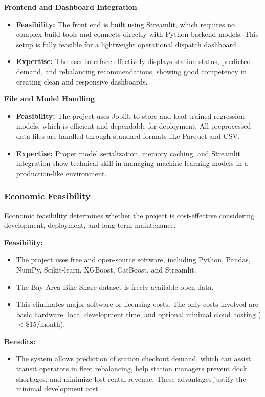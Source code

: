 \documentclass[12pt, a4paper]{article}
\renewcommand{\_}{\textunderscore\allowbreak}
\begin{document}
\noindent \textbf{Frontend and Dashboard Integration}
\begin{itemize}
    \item \textbf{Feasibility:} The front end is built using Streamlit, which requires no complex build tools and connects directly with Python backend models. This setup is fully feasible for a lightweight operational dispatch dashboard.
    \item \textbf{Expertise:} The user interface effectively displays station status, predicted demand, and rebalancing recommendations, showing good competency in creating clean and responsive dashboards.
\end{itemize}

\noindent \textbf{File and Model Handling}
\begin{itemize}
    \item \textbf{Feasibility:} The project uses Joblib to store and load trained regression models, which is efficient and dependable for deployment. All preprocessed data files are handled through standard formats like Parquet and CSV.
    \item \textbf{Expertise:} Proper model serialization, memory caching, and Streamlit integration show technical skill in managing machine learning models in a production-like environment.
\end{itemize}

\subsubsection{Economic Feasibility}

Economic feasibility determines whether the project is cost-effective considering development, deployment, and long-term maintenance.

\noindent \textbf{Feasibility:}
\begin{itemize}
    \item The project uses free and open-source software, including Python, Pandas, NumPy, Scikit-learn, XGBoost, CatBoost, and Streamlit.
    \item The Bay Area Bike Share dataset is freely available open data.
    \item This eliminates major software or licensing costs. The only costs involved are basic hardware, local development time, and optional minimal cloud hosting ($<\$15$/month).
\end{itemize}

\noindent \textbf{Benefits:}
\begin{itemize}
    \item The system allows prediction of station checkout demand, which can assist transit operators in fleet rebalancing, help station managers prevent dock shortages, and minimize lost rental revenue. These advantages justify the minimal development cost.
\end{itemize}
\end{document}
